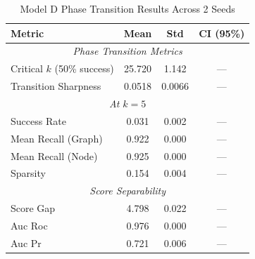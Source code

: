 \begin{table}[htbp]
\centering
\caption{Model D Phase Transition Results Across 2 Seeds}
\label{tab:model_d_results}
\begin{tabular}{lccc}
\hline
\textbf{Metric} & \textbf{Mean} & \textbf{Std} & \textbf{CI (95\%)} \\
\hline
\multicolumn{4}{c}{\textit{Phase Transition Metrics}} \\
Critical $k$ (50\% success) & 25.720 & 1.142 & --- \\
Transition Sharpness & 0.0518 & 0.0066 & --- \\
\hline
\multicolumn{4}{c}{\textit{At $k=5$}} \\
Success Rate & 0.031 & 0.002 & --- \\
Mean Recall (Graph) & 0.922 & 0.000 & --- \\
Mean Recall (Node) & 0.925 & 0.000 & --- \\
Sparsity & 0.154 & 0.004 & --- \\
\hline
\multicolumn{4}{c}{\textit{Score Separability}} \\
Score Gap & 4.798 & 0.022 & --- \\
Auc Roc & 0.976 & 0.000 & --- \\
Auc Pr & 0.721 & 0.006 & --- \\
\hline
\end{tabular}
\end{table}
